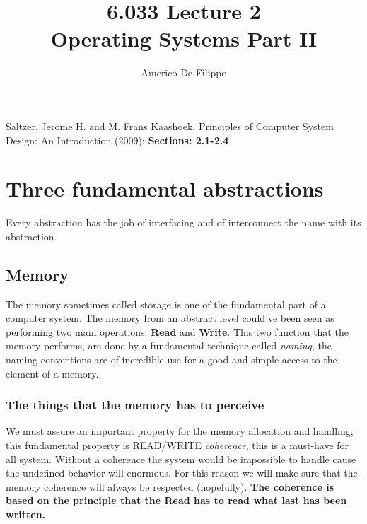 \documentclass{article}
\title{6.033 Lecture 2 \\ Operating Systems Part II}
\author{Americo De Filippo}
\begin{document}
  \maketitle
  \begin{thebibliography}{9}
    Saltzer, Jerome H. and M. Frans Kaashoek. Principles of Computer System Design: An Introduction (2009): \textbf{Sections: 2.1-2.4}
  \end{thebibliography}
  \tableofcontents
  \section{Three fundamental abstractions}
    Every abstraction has the job of interfacing and of interconnect
    the name with its abstraction.
    \subsection{Memory}
      The memory sometimes called storage is one of the fundamental
      part of a computer system. The memory from an abstract level could've
      been seen as performing two main operations: \textbf{Read} and \textbf{Write}.
      This two function that the memory performs, are done by a fundamental
      technique called \textit{naming}, the naming conventions are of incredible use
      for a good and simple access to the element of a memory.
      \subsubsection{The things that the memory has to perceive}
        We must assure an important property for the memory allocation and 
        handling, this fundamental property is READ/WRITE \textit{coherence}, 
        this is a must-have for all system. Without a coherence the system would be 
        impossible to handle cause the undefined behavior will enormous. For this 
        reason we will make sure that the memory coherence will always be respected
        (hopefully).
        \textbf{The coherence is based on the principle that the Read has to read what 
        last has been written.} 
\end{document}
